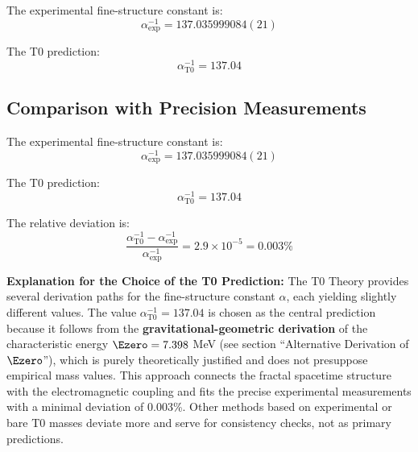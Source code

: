 	The experimental fine-structure constant is:
	\begin{equation}
		\alpha_{\text{exp}}^{-1} = 137.035999084(21)
	\end{equation}
	
	The T0 prediction:
	\begin{equation}
		\alpha_{\text{T0}}^{-1} = 137.04
	\end{equation}
	\subsection{Comparison with Precision Measurements}
	
	The experimental fine-structure constant is:
	\begin{equation}
		\alpha_{\text{exp}}^{-1} = 137.035999084(21)
	\end{equation}
	
	The T0 prediction:
	\begin{equation}
		\alpha_{\text{T0}}^{-1} = 137.04
		\label{eq:alpha_t0}
	\end{equation}
	
	The relative deviation is:
	\begin{equation}
		\frac{\alpha_{\text{T0}}^{-1} - \alpha_{\text{exp}}^{-1}}{\alpha_{\text{exp}}^{-1}} = 2.9 \times 10^{-5} = 0.003\%
	\end{equation}
	
	\textbf{Explanation for the Choice of the T0 Prediction:} The T0 Theory provides several derivation paths for the fine-structure constant $\alpha$, each yielding slightly different values. The value $\alpha_{\text{T0}}^{-1} = 137.04$ is chosen as the central prediction because it follows from the \textbf{gravitational-geometric derivation} of the characteristic energy $\Ezero = 7.398$ MeV (see section ``Alternative Derivation of $\Ezero$''), which is purely theoretically justified and does not presuppose empirical mass values. This approach connects the fractal spacetime structure with the electromagnetic coupling and fits the precise experimental measurements with a minimal deviation of 0.003\%. Other methods based on experimental or bare T0 masses deviate more and serve for consistency checks, not as primary predictions.
	
